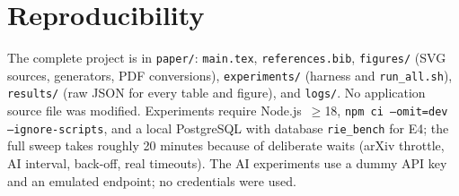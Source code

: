 \documentclass[conference]{IEEEtran}
\newcommand{\code}[1]{\texttt{\small #1}}
\begin{document}
\section*{Reproducibility}
The complete project is in \code{paper/}: \code{main.tex}, \code{references.bib}, \code{figures/} (SVG sources, generators, PDF conversions), \code{experiments/} (harness and \code{run\_all.sh}), \code{results/} (raw JSON for every table and figure), and \code{logs/}. No application source file was modified. Experiments require Node.js~$\ge$18, \code{npm ci --omit=dev --ignore-scripts}, and a local PostgreSQL with database \code{rie\_bench} for E4; the full sweep takes roughly 20 minutes because of deliberate waits (arXiv throttle, AI interval, back-off, real timeouts). The AI experiments use a dummy API key and an emulated endpoint; no credentials were used.



\end{document}
